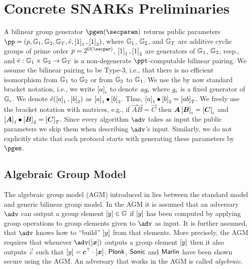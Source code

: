 \section{Concrete SNARKs Preliminaries}

A bilinear group generator $\pgen (\secparam)$ returns public parameters $ \pp =
(p, \GRP_1, \GRP_2, \GRP_T, \pair, \gone{1}, \gtwo{1})$, where $\mathbb{G}_1$,
$\mathbb{G}_2$, and $\mathbb{G}_T$ are additive cyclic groups of prime order $p = 2^{\Omega
  (\secpar)}$, $\left[1\right]_{1}, \left[1\right]_{2}$ are generators of $\mathbb{G}_1$, $\mathbb{G}_2$, resp.,
and $\hat{e}: \mathbb{G}_1 \times \mathbb{G}_2 \to \mathbb{G}_T$ is a non-degenerate
$\ppt$-computable bilinear pairing. We assume the bilinear pairing to be Type-3,
i.e., that there is no efficient isomorphism from $\mathbb{G}_1$ to $\mathbb{G}_2$ or from
$\mathbb{G}_2$ to $\mathbb{G}_1$. We use the by now standard bracket notation, i.e., we
write $\left[a\right]_{\iota}$ to denote $a g_{\iota}$ where $g_{\iota}$ is a fixed generator
of $\mathbb{G}_{\iota}$. We denote $\hat{e} (\left[a\right]_{1}, \left[b\right]_{2})$ as $\left[a\right]_{1} \bullet
\left[b\right]_{2}$. Thus, $\left[a\right]_{1} \bullet \left[b\right]_{2} = \left[a b\right]_{T}$. We freely use the
bracket notation with matrices, e.g., if $\vec{A} \vec{B} = \vec{C}$ then
$\vec{A} \grpgi{\vec{B}} = \grpgi{\vec{C}}$ and $\gone{\vec{A}}\bullet
\gtwo{\vec{B}} = \gtar{\vec{C}}$. Since every algorithm $\adv$ takes as input
the public parameters we skip them when describing $\adv$'s input. Similarly, we
do not explicitly state that each protocol starts with generating these
parameters by $\pgen$.

\subsection{Algebraic Group Model}
The algebraic group model (AGM) introduced in \cite{C:FucKilLos18} lies between the
standard model and generic bilinear group model. In the AGM it is assumed that an
adversary $\adv$ can output a group element $\left[y\right] \in \mathbb{G}$ if $\left[y\right]$ has
been computed by applying group operations to group elements given to $\adv$ as
input. It is further assumed, that $\adv$ knows how to ``build'' $\left[y\right]$ from
that elements. More precisely, the AGM requires that whenever $\adv(\gnone{\vec{x}})$
outputs a group element $\left[y\right]$ then it also outputs $\vec{c}$ such that
$\gnone{y} = \vec{c}^\top \cdot \gnone{\vec{x}}$. $\textnormal{\textsf{Plonk}}$, ${\textnormal{\textsf{Sonic}}}$ and ${\textnormal{\textsf{Marlin}}}$
have been shown secure using the AGM. An adversary that works in the AGM is called
\emph{algebraic}.

